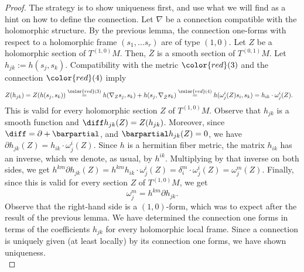 \begin{proof}
    The strategy is to show uniqueness first, and use what we will find as a hint on how to define the connection. Let \(\nabla\) be a connection compatible with the holomorphic structure. By the previous lemma, the connection one-forms with respect to a holomorphic frame \((s_1, \ldots s_r)\) are of type \((1,0)\). Let \(Z\) be a holomorphic section of \(T^{(1,0)}M\). Then, \(\bar{Z}\) is a smooth section of \(T^{(0,1)}M\). Let \(h_{jk}:=h(s_j, s_k)\). Compatibility with the metric \({\color{red}(3)}\) and the connection \({\color{red}(4)}\) imply
    \begin{align} \label{eq1_Chern_connection}
        Z(h_{jk}) & = Z(h(s_j, s_k)) \overset{{\color{red}(3)}}{=} h(\nabla_Z s_j, s_k) +h(s_j, \nabla_{\bar{Z}} s_k) \overset{{\color{red}(4)}}{=}h(\omega^i_j(Z)s_i, s_k)=h_{ik}\cdot \omega^i_j(Z).
    \end{align}
    This is valid for every holomorphic section \(Z\) of \(T^{(1,0)}M\). Observe that \(h_{jk}\) is a smooth function and \(\diff h_{jk}(Z)=Z(h_{jk})\). Moreover, since \(\diff=\partial+\barpartial\), and \(\barpartial h_{jk}(Z)=0\), we have \(\partial h_{jk}(Z)=h_{ik} \cdot \omega^i_j(Z)\). Since \(h\) is a hermitian fiber metric, the matrix \(h_{ik}\) has an inverse, which we denote, as usual, by \(h^{ik}\). Multiplying by that inverse on both sides, we get \(h^{km} \partial h_{jk}(Z)=h^{km}h_{ik} \cdot \omega^i_j(Z)=\delta^m_i \cdot \omega^i_j(Z)=\omega^m_j(Z)\). Finally, since this is valid for every section \(Z\) of \(T^{(1,0)}M\), we get 
    \begin{equation} \label{one_form_Chern_connection}
    \omega^m_j=h^{km} \partial h_{jk}.
    \end{equation}
    Observe that the right-hand side is a \((1,0)\)-form, which was to expect after the result of the previous lemma. We have determined the connection one forms in terms of the coefficients \(h_{jk}\) for every holomorphic local frame. Since a connection is uniquely given (at least locally) by its connection one forms, we have shown uniqueness. \\


\end{proof}
